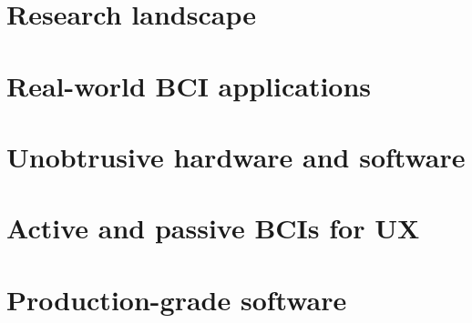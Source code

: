 
\section{Research landscape}
\label{chapter2-research-landscape}


\section{Real-world BCI applications}
\label{chapter2-real-world-bci-applications}






\section{Unobtrusive hardware and software}
\label{chapter2-unobtrusive-hardware-and-software}


\section{Active and passive BCIs for UX}
\label{chapter2-active-and-passive-bcis-for-ux}


\section{Production-grade software}
\label{chapter2-production-grade-software}

